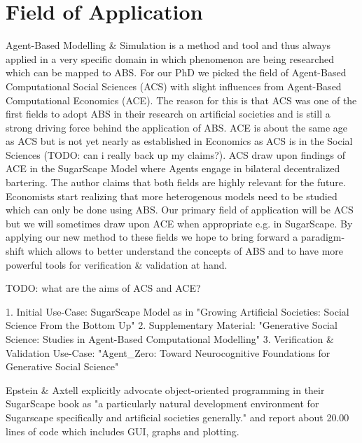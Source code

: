 \section{Field of Application}
Agent-Based Modelling \& Simulation is a method and tool and thus always applied in a very specific domain in which phenomenon are being researched which can be mapped to ABS. For our PhD we picked the field of Agent-Based Computational Social Sciences (ACS) with slight influences from Agent-Based Computational Economics (ACE). The reason for this is that ACS was one of the first fields to adopt ABS in their research on artificial societies and is still a strong driving force behind the application of ABS. ACE is about the same age as ACS but is not yet nearly as established in Economics as ACS is in the Social Sciences (TODO: can i really back up my claims?). ACS draw upon findings of ACE in the SugarScape Model where Agents engage in bilateral decentralized bartering. The author claims that both fields are highly relevant for the future. Economists start realizing that more heterogenous models need to be studied which can only be done using ABS.
Our primary field of application will be ACS but we will sometimes draw upon ACE when appropriate e.g. in SugarScape. By applying our new method to these fields we hope to bring forward a paradigm-shift which allows to better understand the concepts of ABS and to have more powerful tools for verification \& validation at hand.

TODO: what are the aims of ACS and ACE?

1. Initial Use-Case: SugarScape Model as in "Growing Artificial Societies: Social Science From the Bottom Up"
2. Supplementary Material: "Generative Social Science: Studies in Agent-Based Computational Modelling"
3. Verification \& Validation Use-Case: "Agent\_Zero: Toward Neurocognitive Foundations for Generative Social Science"

Epstein \& Axtell explicitly advocate object-oriented programming in their SugarScape book as "a particularly natural development environment for Sugarscape specifically and artificial societies generally." and report about 20.00 lines of code which includes GUI, graphs and plotting.